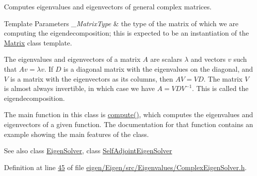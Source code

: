Computes eigenvalues and eigenvectors of general complex matrices. 


\begin{DoxyTemplParams}{Template Parameters}
{\em \+\_\+\+Matrix\+Type} & the type of the matrix of which we are computing the eigendecomposition; this is expected to be an instantiation of the \hyperlink{group___core___module_class_eigen_1_1_matrix}{Matrix} class template.\\
\hline
\end{DoxyTemplParams}
The eigenvalues and eigenvectors of a matrix $ A $ are scalars $ \lambda $ and vectors $ v $ such that $ Av = \lambda v $. If $ D $ is a diagonal matrix with the eigenvalues on the diagonal, and $ V $ is a matrix with the eigenvectors as its columns, then $ A V = V D $. The matrix $ V $ is almost always invertible, in which case we have $ A = V D V^{-1} $. This is called the eigendecomposition.

The main function in this class is \hyperlink{group___eigenvalues___module_aeb7e38c6db5369f5c974f3786e94c1f0}{compute()}, which computes the eigenvalues and eigenvectors of a given function. The documentation for that function contains an example showing the main features of the class.

\begin{DoxySeeAlso}{See also}
class \hyperlink{group___eigenvalues___module_class_eigen_1_1_eigen_solver}{Eigen\+Solver}, class \hyperlink{group___eigenvalues___module_class_eigen_1_1_self_adjoint_eigen_solver}{Self\+Adjoint\+Eigen\+Solver} 
\end{DoxySeeAlso}


Definition at line \hyperlink{eigen_2_eigen_2src_2_eigenvalues_2_complex_eigen_solver_8h_source_l00045}{45} of file \hyperlink{eigen_2_eigen_2src_2_eigenvalues_2_complex_eigen_solver_8h_source}{eigen/\+Eigen/src/\+Eigenvalues/\+Complex\+Eigen\+Solver.\+h}.

